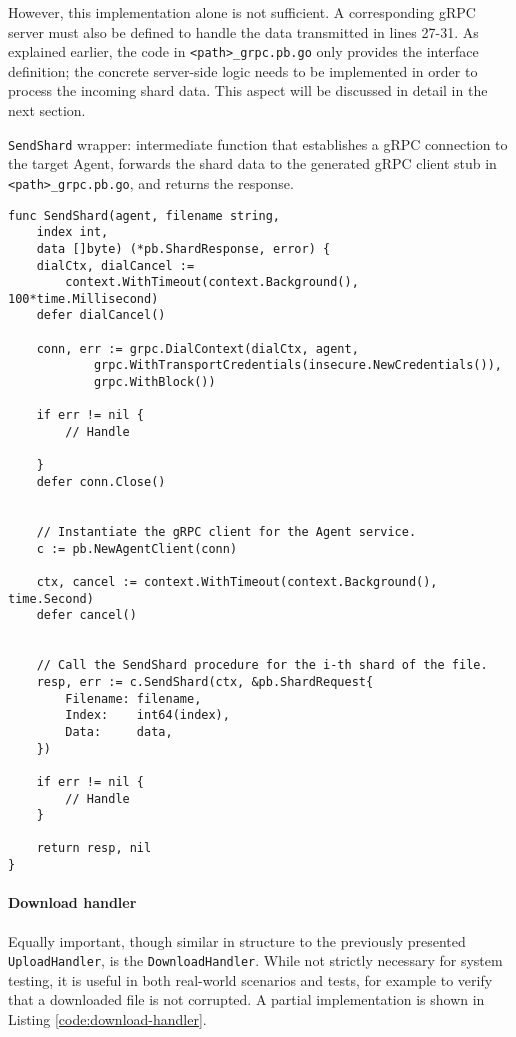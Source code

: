 However, this implementation alone is not sufficient. A corresponding gRPC server must also be defined to handle the data transmitted in lines 27-31. As explained earlier, the code in \texttt{<path>\_grpc.pb.go} only provides the interface definition; the concrete server-side logic needs to be implemented in order to process the incoming shard data. This aspect will be discussed in detail in the next section.

\begin{listing}
\caption{\texttt{SendShard} wrapper: intermediate function that establishes a gRPC connection to the target Agent, forwards the shard data to the generated gRPC client stub in \texttt{<path>\_grpc.pb.go}, and returns the response.}
\label{code:rpc-send-shard}
\begin{verbatim}
func SendShard(agent, filename string,
    index int, 
    data []byte) (*pb.ShardResponse, error) {
    dialCtx, dialCancel := 
        context.WithTimeout(context.Background(), 100*time.Millisecond)
	defer dialCancel()

    conn, err := grpc.DialContext(dialCtx, agent,
            grpc.WithTransportCredentials(insecure.NewCredentials()),
            grpc.WithBlock())

    if err != nil {
        // Handle
    
    }
    defer conn.Close()

    
    // Instantiate the gRPC client for the Agent service.
    c := pb.NewAgentClient(conn) 

    ctx, cancel := context.WithTimeout(context.Background(), time.Second)
    defer cancel()

    
    // Call the SendShard procedure for the i-th shard of the file.
    resp, err := c.SendShard(ctx, &pb.ShardRequest{
        Filename: filename,
        Index:    int64(index),
        Data:     data,
    })

    if err != nil {
        // Handle
    }

    return resp, nil
}
\end{verbatim}
\end{listing}

\paragraph{Download handler}

Equally important, though similar in structure to the previously presented \texttt{UploadHandler}, is the \texttt{DownloadHandler}. While not strictly necessary for system testing, it is useful in both real-world scenarios and tests, for example to verify that a downloaded file is not corrupted. A partial implementation is shown in Listing \ref{code:download-handler}.

